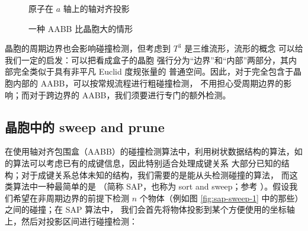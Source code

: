 \begin{figure}[htbp!]\bfcmd
\setlength{\columnsep}{2.5em}
\begin{floatrow}
		{\caption{原子在 $a$ 轴上的轴对齐投影}\label{fig:aabb-width-1}}
		{\caption{一种 AABB 比晶胞大的情形}\label{fig:aabb-width-2}}
\end{floatrow}
\end{figure}

晶胞的周期边界也会影响碰撞检测，但考虑到 $T^3$ 是三维流形，流形的概念%
\parencite[161]{dodson1991}可以给我们一定的启发：可以把看成盒子的晶胞
强行分为“边界”和“内部”两部分，其内部完全类似于具有非平凡 Euclid 度规张量的
普通空间。因此，对于完全包含于晶胞内部的 AABB，可以按常规流程进行粗碰撞检测，
不用担心受周期边界的影响；而对于跨边界的 AABB，我们须要进行专门的额外检测。

\subsection{晶胞中的 sweep and prune}\label{ssec:cryst-sap}

在使用轴对齐包围盒（AABB）的碰撞检测算法中，利用树状数据结构的算法，如
\textcite{grudinin2010}的算法可以考虑已有的成键信息，因此特别适合处理成键关系
大部分已知的结构；对于成键关系总体未知的结构，我们需要的是能从头检测碰撞的算法，
而这类算法中一种最简单的是 （简称 SAP，也称为 sort and
sweep；参考 \cite[329-338]{ericson2005}）。假设我们希望在非周期边界的前提下检测
$n$ 个物体（例如图 \ref{fig:sap-sweep-1} 中的那些）之间的碰撞；在 SAP 算法中，
我们会首先将物体投影到某个方便使用的坐标轴上，然后对投影区间进行碰撞检测：

